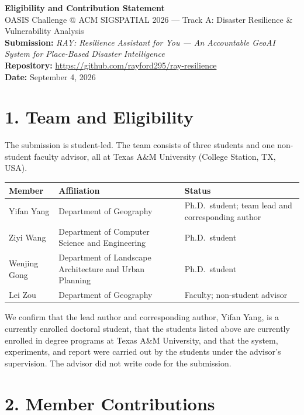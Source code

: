 \documentclass[10pt,letterpaper]{article}
\begin{document}
\begin{center}
{\Large\bfseries Eligibility and Contribution Statement}\\[4pt]
{\large OASIS Challenge @ ACM SIGSPATIAL 2026 --- Track A: Disaster Resilience \& Vulnerability Analysis}\\[8pt]
\textbf{Submission:} \emph{RAY: Resilience Assistant for You --- An Accountable GeoAI System for Place-Based Disaster Intelligence}\\
\textbf{Repository:} \url{https://github.com/rayford295/ray-resilience}\\
\textbf{Date:} September 4, 2026
\end{center}

\section*{1. Team and Eligibility}

The submission is student-led. The team consists of three students and one non-student faculty advisor, all at Texas A\&M University (College Station, TX, USA).

\begin{center}
\renewcommand{\arraystretch}{1.25}
\begin{tabular}{@{}p{1.35in}p{2.35in}p{2.6in}@{}}
\toprule
\textbf{Member} & \textbf{Affiliation} & \textbf{Status} \\
\midrule
Yifan Yang & Department of Geography & Ph.D.\ student; team lead and corresponding author \\
Ziyi Wang & Department of Computer Science and Engineering & Ph.D.\ student \\
Wenjing Gong & Department of Landscape Architecture and Urban Planning & Ph.D.\ student \\
Lei Zou & Department of Geography & Faculty; non-student advisor \\
\bottomrule
\end{tabular}
\end{center}

We confirm that the lead author and corresponding author, Yifan Yang, is a currently enrolled doctoral student, that the students listed above are currently enrolled in degree programs at Texas A\&M University, and that the system, experiments, and report were carried out by the students under the advisor's supervision. The advisor did not write code for the submission.

\section*{2. Member Contributions}
\end{document}
